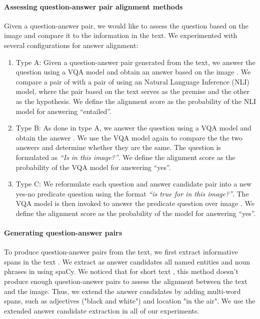 \documentclass{article}
\begin{document}
\paragraph{Assessing question-answer pair alignment methods} Given a question-answer pair, we would like to assess the question based on the image and compare it to the information in the text.
We experimented with several configurations for answer alignment:

\begin{enumerate}
    \item Type A: Given a question-answer pair  generated from the text, we answer the question using a VQA model and obtain an answer based on the image .
    We compare a pair of  with a pair of  using an Natural Language Inference (NLI) model, where the pair based on the text serves as the premise and the other as the hypothesis. We define the alignment score  as the probability of the NLI model for answering ``entailed''.
    \item Type B: As done in type A, we answer the question using a VQA model and obtain the answer .
    We use the VQA model again to compare the the two answers and determine whether they are the same. The question is formulated as \textit{``Is  in this image?''}. We define the alignment score  as the probability of the VQA model for answering ``yes''.
    \item Type C: We reformulate each question and answer candidate pair  into a new yes-no predicate question  using the format \textit{``is  true for  in this image?''}. The VQA model is then invoked to answer the predicate question  over image . We define the alignment score  as the probability of the model for answering ``yes''.
\end{enumerate}

\paragraph{Generating question-answer pairs} To produce question-answer pairs from the text, we first extract informative spans in the text . 
We extract as answer candidates all named entities and noun phrases in  using spaCy.
We noticed that for short text , this method doesn't produce enough question-answer pairs to assess the alignment between the text and the image. Thus, we extend the answer candidates by adding multi-word spans, such as adjectives ("black and white") and location "in the air". We use the extended answer candidate extraction in all of our experiments.
\end{document}
